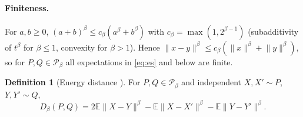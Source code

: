 \documentclass[11pt]{article}
\theoremstyle{definition}
\newtheorem{definition}[theorem]{Definition}
\theoremstyle{remark}
\newcommand{\E}{\mathbb{E}}
\newcommand{\Pb}{\mathcal{P}}
\newcommand{\norm}[1]{\lVert #1\rVert}
\newcommand{\Db}{D_\beta}
\begin{document}
\paragraph{Finiteness.} For $a,b\ge0$, $(a+b)^\beta\le c_\beta(a^\beta+b^\beta)$ with
$c_\beta=\max(1,2^{\beta-1})$ (subadditivity of $t^\beta$ for $\beta\le1$, convexity for $\beta>1$). Hence
$\norm{x-y}^\beta\le c_\beta(\norm{x}^\beta+\norm{y}^\beta)$, so for $P,Q\in\Pb_\beta$ all expectations in
\eqref{eq:es} and below are finite.

\begin{definition}[Energy distance {\cite[Def.~1, Prop.~2]{SR2013}}]
For $P,Q\in\Pb_\beta$ and independent $X,X'\sim P$, $Y,Y'\sim Q$,
\begin{equation}\label{eq:ed}
\Db(P,Q)=2\E\norm{X-Y}^\beta-\E\norm{X-X'}^\beta-\E\norm{Y-Y'}^\beta .
\end{equation}
\end{definition}
\end{document}
